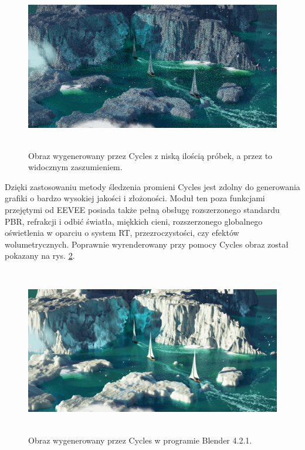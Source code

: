 \begin{itemize}
	\vfill
	\clearpage

	\begin{figure}[htbp]
		\centering
		\includegraphics[width=5.81975in,height=2.875in]{images/15_cycles_low_samples.png}
		\caption{Obraz wygenerowany przez Cycles z niską ilością próbek, a przez to widocznym zaszumieniem.}
		\label{intro-cycles-low}
	\end{figure}

	Dzięki zastosowaniu metody śledzenia promieni Cycles jest zdolny do generowania grafiki o bardzo wysokiej jakości i złożoności. Moduł ten poza funkcjami przejętymi od EEVEE posiada także pełną obsługę rozszerzonego standardu PBR, refrakcji i odbić światła, miękkich cieni, rozszerzonego globalnego oświetlenia w oparciu o system RT, przezroczystości, czy efektów wolumetrycznych. Poprawnie wyrenderowany przy pomocy Cycles obraz został pokazany na rys. \ref{intro-cycles-high}.

	\begin{figure}[htbp]
		\centering
		\includegraphics[width=5.81974in,height=2.875in]{images/16_high_samples.png}
		\caption{Obraz wygenerowany przez Cycles w programie Blender 4.2.1.}
		\label{intro-cycles-high}
	\end{figure}


\end{itemize}
